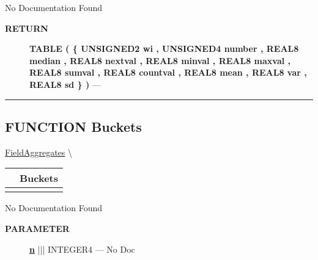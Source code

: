 \par





No Documentation Found








\par
\begin{description}
\item [\colorbox{tagtype}{\color{white} \textbf{\textsf{RETURN}}}] \textbf{TABLE ( \{ UNSIGNED2 wi , UNSIGNED4 number , REAL8 median , REAL8 nextval , REAL8 minval , REAL8 maxval , REAL8 sumval , REAL8 countval , REAL8 mean , REAL8 var , REAL8 sd \} )} --- 
\end{description}




\rule{\linewidth}{0.5pt}
\subsection*{\textsf{\colorbox{headtoc}{\color{white} FUNCTION}
Buckets}}

\hypertarget{ecldoc:ml_core.fieldaggregates.buckets}{}
\hspace{0pt} \hyperlink{ecldoc:ml_core.fieldaggregates}{FieldAggregates} \textbackslash 

{\renewcommand{\arraystretch}{1.5}
\begin{tabularx}{\textwidth}{|>{\raggedright\arraybackslash}l|X|}
\hline
\hspace{0pt}\mytexttt{\color{red} } & \textbf{Buckets} \\
\hline
\multicolumn{2}{|>{\raggedright\arraybackslash}X|}{\hspace{0pt}\mytexttt{\color{param} (Types.t\_Discrete n)}} \\
\hline
\end{tabularx}
}

\par





No Documentation Found






\par
\begin{description}
\item [\colorbox{tagtype}{\color{white} \textbf{\textsf{PARAMETER}}}] \textbf{\underline{n}} ||| INTEGER4 --- No Doc
\end{description}







